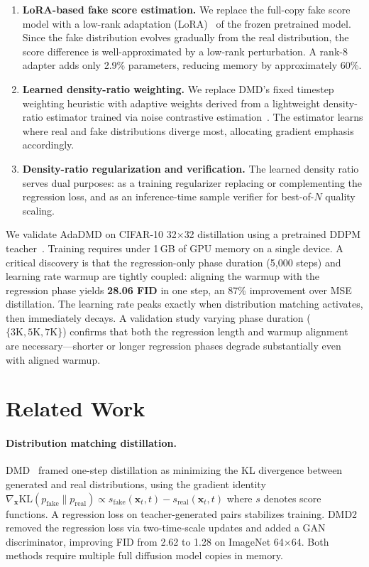 \documentclass{article}
\theoremstyle{plain}
\theoremstyle{remark}
\newcommand{\KL}{\mathrm{KL}}
\newcommand{\bx}{\mathbf{x}}
\begin{document}
\begin{enumerate}
\item \textbf{LoRA-based fake score estimation.} We replace the full-copy fake score model with a low-rank adaptation (LoRA)~\citep{hu2022lora} of the frozen pretrained model. Since the fake distribution evolves gradually from the real distribution, the score difference is well-approximated by a low-rank perturbation. A rank-8 adapter adds only 2.9\% parameters, reducing memory by approximately 60\%.

\item \textbf{Learned density-ratio weighting.} We replace DMD's fixed timestep weighting heuristic with adaptive weights derived from a lightweight density-ratio estimator trained via noise contrastive estimation~\citep{gutmann2010noise}. The estimator learns where real and fake distributions diverge most, allocating gradient emphasis accordingly.

\item \textbf{Density-ratio regularization and verification.} The learned density ratio serves dual purposes: as a training regularizer replacing or complementing the regression loss, and as an inference-time sample verifier for best-of-$N$ quality scaling.
\end{enumerate}

We validate AdaDMD on CIFAR-10 32$\times$32 distillation using a pretrained DDPM teacher~\citep{ho2020denoising}. Training requires under 1\,GB of GPU memory on a single device. A critical discovery is that the regression-only phase duration (5,000 steps) and learning rate warmup are tightly coupled: aligning the warmup with the regression phase yields \textbf{28.06 FID} in one step, an 87\% improvement over MSE distillation. The learning rate peaks exactly when distribution matching activates, then immediately decays. A validation study varying phase duration ($\{3\text{K}, 5\text{K}, 7\text{K}\}$) confirms that both the regression length and warmup alignment are necessary---shorter or longer regression phases degrade substantially even with aligned warmup.

\section{Related Work}
\label{sec:related}

\paragraph{Distribution matching distillation.}
DMD~\citep{yin2024onestep} framed one-step distillation as minimizing the KL divergence between generated and real distributions, using the gradient identity $\nabla_{\bx} \KL(p_{\text{fake}} \| p_{\text{real}}) \propto s_{\text{fake}}(\bx_t, t) - s_{\text{real}}(\bx_t, t)$ where $s$ denotes score functions. A regression loss on teacher-generated pairs stabilizes training. DMD2~\citep{yin2024dmd2} removed the regression loss via two-time-scale updates and added a GAN discriminator, improving FID from 2.62 to 1.28 on ImageNet 64$\times$64. Both methods require multiple full diffusion model copies in memory.
\end{document}
